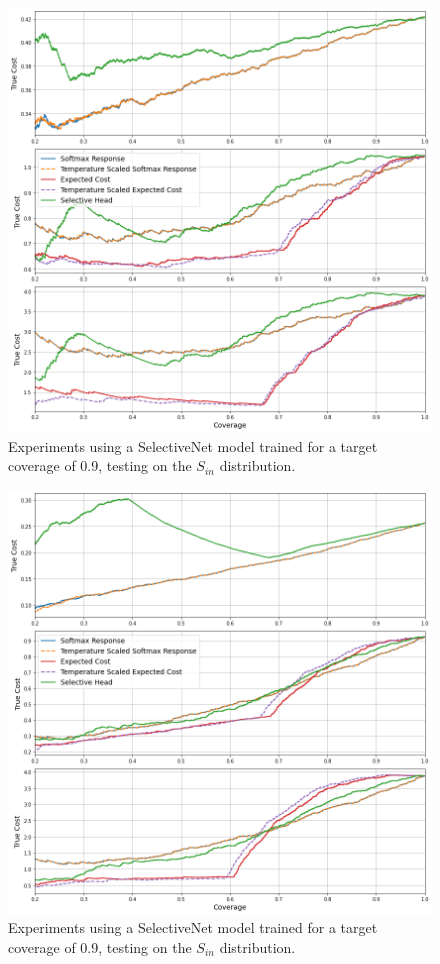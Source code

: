 \begin{figure}[H]
	\includegraphics[width=\textwidth]{images/binary/sn0.9_out_distribution.png}
	\caption*{Experiments using a SelectiveNet model trained for a target coverage of 0.9, testing on the $S_{in}$ distribution.}
\end{figure}

\begin{figure}[H]
	\includegraphics[width=\textwidth]{images/binary/sn0.9_combine_distribution.png}
	\caption*{Experiments using a SelectiveNet model trained for a target coverage of 0.9, testing on the $S_{in}$ distribution.}
\end{figure}

